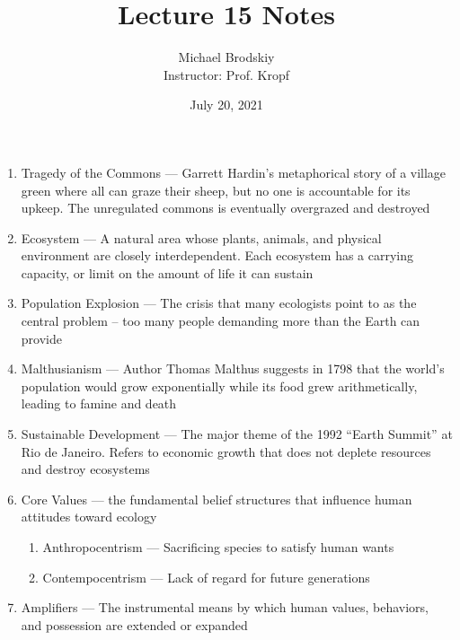 \documentclass[12pt]{article}
\title{Lecture 15 Notes}
\date{July 20, 2021}
\author{Michael Brodskiy\\ \small Instructor: Prof. Kropf}
\begin{document}
    \maketitle

    \begin{enumerate}

      \item Tragedy of the Commons — Garrett Hardin’s metaphorical story of a village green where all can graze their sheep, but no one is accountable for its upkeep. The unregulated commons is eventually overgrazed and destroyed

      \item Ecosystem — A natural area whose plants, animals, and physical environment are closely interdependent. Each ecosystem has a carrying capacity, or limit on the amount of life it can sustain

      \item Population Explosion — The crisis that many ecologists point to as the central problem – too many people demanding more than the Earth can provide

      \item Malthusianism — Author Thomas Malthus suggests in 1798 that the world’s population would grow exponentially while its food grew arithmetically, leading to famine and death

      \item Sustainable Development — The major theme of the 1992 “Earth Summit” at Rio de Janeiro. Refers to economic growth that does not deplete resources and destroy ecosystems

      \item Core Values — the fundamental belief structures that influence human attitudes toward ecology

        \begin{enumerate}

          \item Anthropocentrism — Sacrificing species to satisfy human wants

          \item Contempocentrism — Lack of regard for future generations

        \end{enumerate}

      \item Amplifiers — The instrumental means by which human values, behaviors, and possession are extended or expanded

        \begin{enumerate}


\end{enumerate}
\end{enumerate}
\end{document}
